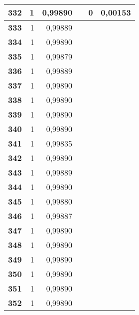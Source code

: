 {\begin{longtable}{|r|r|r|l|r|r|}
\textbf{332} & 1 & 0,99890 &  & 0 & 0,00153 \\ \hline
\textbf{333} & 1 & 0,99889 &  & \multicolumn{1}{l|}{} & \multicolumn{1}{l|}{} \\ \hline
\textbf{334} & 1 & 0,99890 &  & \multicolumn{1}{l|}{} & \multicolumn{1}{l|}{} \\ \hline
\textbf{335} & 1 & 0,99879 &  & \multicolumn{1}{l|}{} & \multicolumn{1}{l|}{} \\ \hline
\textbf{336} & 1 & 0,99889 &  & \multicolumn{1}{l|}{} & \multicolumn{1}{l|}{} \\ \hline
\textbf{337} & 1 & 0,99890 &  & \multicolumn{1}{l|}{} & \multicolumn{1}{l|}{} \\ \hline
\textbf{338} & 1 & 0,99890 &  & \multicolumn{1}{l|}{} & \multicolumn{1}{l|}{} \\ \hline
\textbf{339} & 1 & 0,99890 &  & \multicolumn{1}{l|}{} & \multicolumn{1}{l|}{} \\ \hline
\textbf{340} & 1 & 0,99890 &  & \multicolumn{1}{l|}{} & \multicolumn{1}{l|}{} \\ \hline
\textbf{341} & 1 & 0,99835 &  & \multicolumn{1}{l|}{} & \multicolumn{1}{l|}{} \\ \hline
\textbf{342} & 1 & 0,99890 &  & \multicolumn{1}{l|}{} & \multicolumn{1}{l|}{} \\ \hline
\textbf{343} & 1 & 0,99889 &  & \multicolumn{1}{l|}{} & \multicolumn{1}{l|}{} \\ \hline
\textbf{344} & 1 & 0,99890 &  & \multicolumn{1}{l|}{} & \multicolumn{1}{l|}{} \\ \hline
\textbf{345} & 1 & 0,99880 &  & \multicolumn{1}{l|}{} & \multicolumn{1}{l|}{} \\ \hline
\textbf{346} & 1 & 0,99887 &  & \multicolumn{1}{l|}{} & \multicolumn{1}{l|}{} \\ \hline
\textbf{347} & 1 & 0,99890 &  & \multicolumn{1}{l|}{} & \multicolumn{1}{l|}{} \\ \hline
\textbf{348} & 1 & 0,99890 &  & \multicolumn{1}{l|}{} & \multicolumn{1}{l|}{} \\ \hline
\textbf{349} & 1 & 0,99890 &  & \multicolumn{1}{l|}{} & \multicolumn{1}{l|}{} \\ \hline
\textbf{350} & 1 & 0,99890 &  & \multicolumn{1}{l|}{} & \multicolumn{1}{l|}{} \\ \hline
\textbf{351} & 1 & 0,99890 &  & \multicolumn{1}{l|}{} & \multicolumn{1}{l|}{} \\ \hline
\textbf{352} & 1 & 0,99890 &  & \multicolumn{1}{l|}{} & \multicolumn{1}{l|}{} \\ \hline

\end{longtable}}
